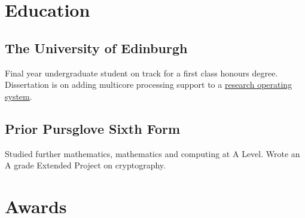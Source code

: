 \documentclass[]{deedy-resume-openfont}
\begin{document}
%
%

%
%

\begin{minipage}[t]{0.33\textwidth} 


\section{Education} 

\subsection{The University \newline of Edinburgh}
Final year undergraduate student on track for a first class honours degree. Dissertation is on adding multicore processing support to a \href{https://github.com/kimbethstonehouse/infos}{\underline{research operating system}}. \\
\sectionsep

\subsection{Prior Pursglove \newline Sixth Form}
Studied further mathematics, mathematics and computing at A Level. Wrote an A grade Extended Project on cryptography. \\
\sectionsep


\section{Awards}


\end{minipage}
\end{document}
